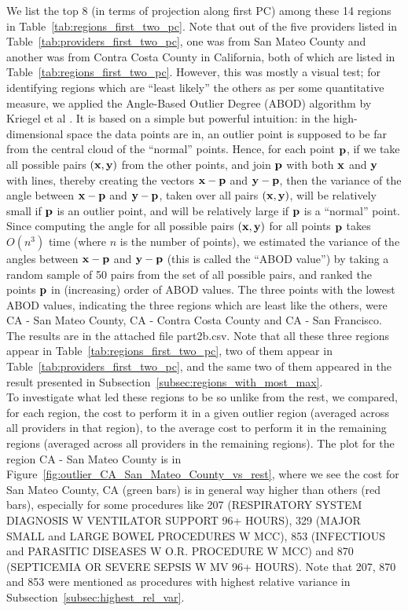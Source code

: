 We list the top 8 (in terms of projection along first PC) among these 14 regions in Table~\ref{tab:regions_first_two_pc}. Note that out of the five providers listed in Table~\ref{tab:providers_first_two_pc}, one was from San Mateo County and another was from Contra Costa County in California, both of which are listed in Table~\ref{tab:regions_first_two_pc}. However, this was mostly a visual test; for identifying regions which are ``least likely'' the others as per some quantitative measure, we applied the Angle-Based Outlier Degree (ABOD) algorithm by Kriegel et al \cite{KSZ08}. It is based on a simple but powerful intuition: in the high-dimensional space the data points are in, an outlier point is supposed to be far from the central cloud of the ``normal'' points. Hence, for each point $\bf{p}$, if we take all possible pairs $(\bf{x}, \bf{y})$ from the other points, and join $\bf{p}$ with both $\bf{x}$ and $\bf{y}$ with lines, thereby creating the vectors $\bf{x} - \bf{p}$ and $\bf{y} - \bf{p}$, then the variance of the angle between $\bf{x} - \bf{p}$ and $\bf{y} - \bf{p}$, taken over all pairs $(\bf{x}, \bf{y})$, will be relatively small if $\bf{p}$ is an outlier point, and will be relatively large if $\bf{p}$ is a ``normal'' point. Since computing the angle for all possible pairs $(\bf{x}, \bf{y})$ for all points $\bf{p}$ takes $O(n^3)$ time (where $n$ is the number of points), we estimated the variance of the angles between $\bf{x} - \bf{p}$ and $\bf{y} - \bf{p}$ (this is called the ``ABOD value'') by taking a random sample of 50 pairs from the set of all possible pairs, and ranked the points $\bf{p}$ in (increasing) order of ABOD values. The three points with the lowest ABOD values, indicating the three regions which are least like the others, were CA - San Mateo County, CA - Contra Costa County and CA - San Francisco. The results are in the attached file part2b.csv. Note that all these three regions appear in Table~\ref{tab:regions_first_two_pc}, two of them appear in Table~\ref{tab:providers_first_two_pc}, and the same two of them appeared in the result presented in Subsection~\ref{subsec:regions_with_most_max}.\\

To investigate what led these regions to be so unlike from the rest, we compared, for each region, the cost to perform it in a given outlier region (averaged across all providers in that region), to the average cost to perform it in the remaining regions (averaged across all providers in the remaining regions). The plot for the region CA - San Mateo County is in Figure~\ref{fig:outlier_CA_San_Mateo_County_vs_rest}, where we see the cost for San Mateo County, CA (green bars) is in general way higher than others (red bars), especially for some procedures like 207 (RESPIRATORY SYSTEM DIAGNOSIS W VENTILATOR SUPPORT 96+ HOURS), 329 (MAJOR SMALL and LARGE BOWEL PROCEDURES W MCC), 853 (INFECTIOUS and PARASITIC DISEASES W O.R. PROCEDURE W MCC) and 870 (SEPTICEMIA OR SEVERE SEPSIS W MV 96+ HOURS). Note that 207, 870 and 853 were mentioned as procedures with highest relative variance in Subsection~\ref{subsec:highest_rel_var}.

